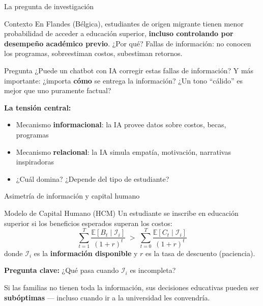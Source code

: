\documentclass[aspectratio=169, 11pt]{beamer}
\begin{document}
\begin{frame}{La pregunta de investigación}
\begin{block}{Contexto}
\small
En Flandes (Bélgica), estudiantes de origen migrante tienen menor probabilidad de acceder a educación superior, \textbf{incluso controlando por desempeño académico previo}. ¿Por qué? Fallas de información: no conocen los programas, sobreestiman costos, subestiman retornos.
\end{block}

\vspace{0.2cm}
\begin{exampleblock}{Pregunta}
\small
¿Puede un chatbot con IA corregir estas fallas de información? Y más importante: ¿importa \textbf{cómo} se entrega la información? ¿Un tono ``cálido'' es mejor que uno puramente factual?
\end{exampleblock}

\vspace{0.2cm}
\textbf{La tensión central:}
\begin{itemize}
  \item Mecanismo \textbf{informacional}: la IA provee datos sobre costos, becas, programas
  \item Mecanismo \textbf{relacional}: la IA simula empatía, motivación, narrativas inspiradoras
  \item ¿Cuál domina? ¿Depende del tipo de estudiante?
\end{itemize}
\end{frame}

\begin{frame}{Asimetría de información y capital humano}
\begin{block}{Modelo de Capital Humano (HCM)}
Un estudiante se inscribe en educación superior si los beneficios esperados superan los costos:
\[
\sum_{t=1}^{T} \frac{\mathbb{E}[B_t \mid \mathcal{I}_i]}{(1+r)^t} \;>\; \sum_{t=0}^{T} \frac{\mathbb{E}[C_t \mid \mathcal{I}_i]}{(1+r)^t}
\]
donde $\mathcal{I}_i$ es la \textbf{información disponible} y $r$ es la tasa de descuento (paciencia).
\end{block}

\vspace{0.3cm}
\textbf{Pregunta clave:} ¿Qué pasa cuando $\mathcal{I}_i$ es incompleta?

Si las familias no tienen toda la información, sus decisiones educativas pueden ser \textbf{subóptimas} --- incluso cuando ir a la universidad les convendría.
\end{frame}
\end{document}
